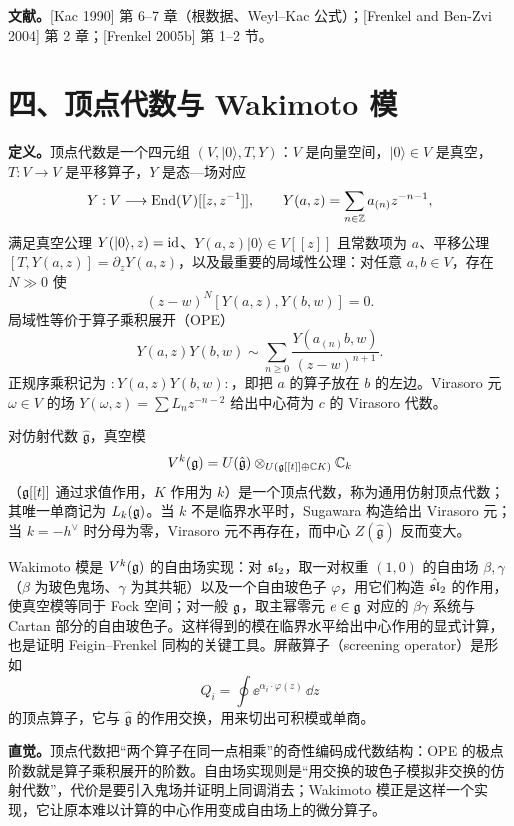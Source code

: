 \textbf{文献。}[Kac 1990] 第 6–7 章（根数据、Weyl--Kac 公式）；[Frenkel and Ben-Zvi 2004] 第 2 章；[Frenkel 2005b] 第 1–2 节。

\section*{四、顶点代数与 Wakimoto 模}

\textbf{定义。}顶点代数是一个四元组 $(V,|0\rangle,T,Y)$：$V$ 是向量空间，$|0\rangle\in V$ 是真空，$T:V\to V$ 是平移算子，$Y$ 是态—场对应
\[
  Y:V\longrightarrow \operatorname{End}(V)[[z,z^{-1}]],\qquad
  Y(a,z)=\sum_{n\in\mathbb{Z}}a_{(n)}z^{-n-1},
\]
满足真空公理 $Y(|0\rangle,z)=\mathrm{id}$、$Y(a,z)|0\rangle\in V[[z]]$ 且常数项为 $a$、平移公理 $[T,Y(a,z)]=\partial_zY(a,z)$，以及最重要的局域性公理：对任意 $a,b\in V$，存在 $N\gg0$ 使
\[
  (z-w)^N[Y(a,z),Y(b,w)]=0 .
\]
局域性等价于算子乘积展开（OPE）
\[
  Y(a,z)Y(b,w)\sim\sum_{n\ge0}\frac{Y(a_{(n)}b,w)}{(z-w)^{n+1}} .
\]
正规序乘积记为 $:Y(a,z)Y(b,w):$，即把 $a$ 的算子放在 $b$ 的左边。Virasoro 元 $\omega\in V$ 的场 $Y(\omega,z)=\sum L_nz^{-n-2}$ 给出中心荷为 $c$ 的 Virasoro 代数。

对仿射代数 $\hat{\mathfrak{g}}$，真空模
\[
  V^k(\mathfrak{g})=U(\hat{\mathfrak{g}})\otimes_{U(\mathfrak{g}[[t]]\oplus\mathbb{C} K)}\mathbb{C}_k
\]
（$\mathfrak{g}[[t]]$ 通过求值作用，$K$ 作用为 $k$）是一个顶点代数，称为通用仿射顶点代数；其唯一单商记为 $L_k(\mathfrak{g})$。当 $k$ 不是临界水平时，Sugawara 构造给出 Virasoro 元；当 $k=-h^\vee$ 时分母为零，Virasoro 元不再存在，而中心 $Z(\hat{\mathfrak{g}})$ 反而变大。

Wakimoto 模是 $V^k(\mathfrak{g})$ 的自由场实现：对 $\mathfrak{sl}_2$，取一对权重 $(1,0)$ 的自由场 $\beta,\gamma$（$\beta$ 为玻色鬼场、$\gamma$ 为其共轭）以及一个自由玻色子 $\varphi$，用它们构造 $\hat{\mathfrak{sl}}_2$ 的作用，使真空模等同于 Fock 空间；对一般 $\mathfrak{g}$，取主幂零元 $e\in\mathfrak{g}$ 对应的 $\beta\gamma$ 系统与 Cartan 部分的自由玻色子。这样得到的模在临界水平给出中心作用的显式计算，也是证明 Feigin--Frenkel 同构的关键工具。屏蔽算子（screening operator）是形如
\[
  Q_i=\oint \ee^{\alpha_i\cdot\varphi(z)}\,\dd z
\]
的顶点算子，它与 $\hat{\mathfrak{g}}$ 的作用交换，用来切出可积模或单商。

\textbf{直觉。}顶点代数把“两个算子在同一点相乘”的奇性编码成代数结构：OPE 的极点阶数就是算子乘积展开的阶数。自由场实现则是“用交换的玻色子模拟非交换的仿射代数”，代价是要引入鬼场并证明上同调消去；Wakimoto 模正是这样一个实现，它让原本难以计算的中心作用变成自由场上的微分算子。

